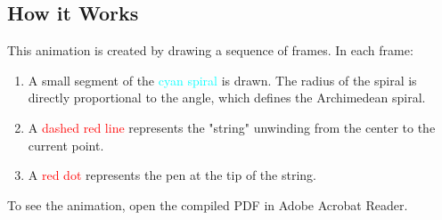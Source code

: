 \documentclass{article}
\begin{document}
\begin{center}
\subsection*{How it Works}
This animation is created by drawing a sequence of frames. In each frame:
\begin{enumerate}
    \item A small segment of the \textcolor{cyan}{cyan spiral} is drawn. The radius of the spiral is directly proportional to the angle, which defines the Archimedean spiral.
    \item A \textcolor{red}{dashed red line} represents the "string" unwinding from the center to the current point.
    \item A \textcolor{red}{red dot} represents the pen at the tip of the string.
\end{enumerate}
To see the animation, open the compiled PDF in Adobe Acrobat Reader.

\end{center}
\end{document}
